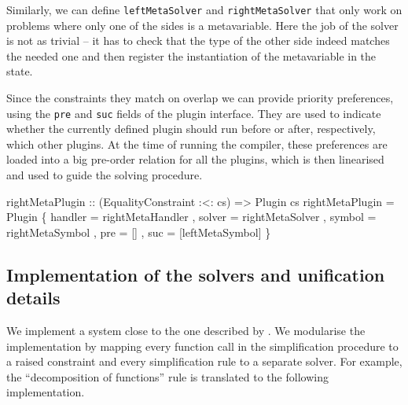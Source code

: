 \documentclass[
  sigconf,
  screen,
  review]{acmart}
\newenvironment{Shaded}{}{}
\newcommand{\DataTypeTok}[1]{\textcolor[rgb]{0.56,0.13,0.00}{#1}}
\newcommand{\NormalTok}[1]{#1}
\newcommand{\OperatorTok}[1]{\textcolor[rgb]{0.40,0.40,0.40}{#1}}
\newcommand{\OtherTok}[1]{\textcolor[rgb]{0.00,0.44,0.13}{#1}}
\begin{document}
Similarly, we can define \texttt{leftMetaSolver} and
\texttt{rightMetaSolver} that only work on problems where only one of
the sides is a metavariable. Here the job of the solver is not as
trivial -- it has to check that the type of the other side indeed
matches the needed one and then register the instantiation of the
metavariable in the state.

Since the constraints they match on overlap we can provide priority
preferences, using the \texttt{pre} and \texttt{suc} fields of the
plugin interface. They are used to indicate whether the currently
defined plugin should run before or after, respectively, which other
plugins. At the time of running the compiler, these preferences are
loaded into a big pre-order relation for all the plugins, which is then
linearised and used to guide the solving procedure.

\begin{Shaded}
\begin{Highlighting}[]
\OtherTok{rightMetaPlugin ::}\NormalTok{ (}\DataTypeTok{EqualityConstraint} \OperatorTok{:\textless{}:}\NormalTok{ cs)}
                \OtherTok{=\textgreater{}} \DataTypeTok{Plugin}\NormalTok{ cs}
\NormalTok{rightMetaPlugin }\OtherTok{=}
  \DataTypeTok{Plugin}\NormalTok{ \{ handler }\OtherTok{=}\NormalTok{ rightMetaHandler}
\NormalTok{         , solver  }\OtherTok{=}\NormalTok{ rightMetaSolver}
\NormalTok{         , symbol  }\OtherTok{=}\NormalTok{ rightMetaSymbol}
\NormalTok{         , pre }\OtherTok{=}\NormalTok{ []}
\NormalTok{         , suc }\OtherTok{=}\NormalTok{ [leftMetaSymbol]}
\NormalTok{         \}}
\end{Highlighting}
\end{Shaded}

\hypertarget{sec:solvers-implementation}{%
\subsection{Implementation of the solvers and unification
details}\label{sec:solvers-implementation}}

We implement a system close to the one described by
\citet{abelHigherOrderDynamicPattern2011}. We modularise the
implementation by mapping every function call in the simplification
procedure to a raised constraint and every simplification rule to a
separate solver. For example, the ``decomposition of functions''
\citep[fig.~2]{abelHigherOrderDynamicPattern2011} rule is translated to
the following implementation.
\end{document}
